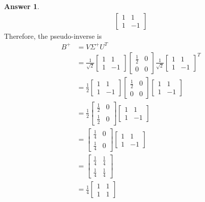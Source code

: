 \documentclass[10pt,a4paper]{article}
\theoremstyle{definition}
\newtheorem*{answer*}{Answer}
\theoremstyle{definition}
\numberwithin{equation}{section}
\begin{document}
\begin{answer*}
\begin{align*}
\begin{bmatrix}
1 & 1\\1 & -1
\end{bmatrix}
\end{align*}
Therefore, the pseudo-inverse is
\begin{align*}
B^+ &= V \Sigma^+ U^T\\
&= \frac{1}{\sqrt{2}}\begin{bmatrix}
1 & 1\\1 & -1
\end{bmatrix} \begin{bmatrix}
\frac{1}{2} & 0\\0 & 0
\end{bmatrix} \frac{1}{\sqrt{2}} \begin{bmatrix}
1 & 1\\1 & -1
\end{bmatrix}^T\\
&= \frac{1}{2} \begin{bmatrix}
1 & 1\\1 & -1
\end{bmatrix} \begin{bmatrix}
\frac{1}{2} & 0\\0 & 0
\end{bmatrix} \begin{bmatrix}
1 & 1\\1 & -1
\end{bmatrix}\\
&= \frac{1}{2} \begin{bmatrix}
\frac{1}{2} & 0\\\frac{1}{2} & 0
\end{bmatrix} \begin{bmatrix}
1 & 1\\1 & -1
\end{bmatrix}\\
&= \begin{bmatrix}
\frac{1}{4} & 0\\\frac{1}{4} & 0
\end{bmatrix} \begin{bmatrix}
1 & 1\\1 & -1
\end{bmatrix}\\
&= \begin{bmatrix}
\frac{1}{4} & \frac{1}{4}\\
\frac{1}{4} & \frac{1}{4}
\end{bmatrix}\\
&= \frac{1}{4} \begin{bmatrix}
1 & 1\\1 & 1
\end{bmatrix}
\end{align*}
\end{answer*}
\end{document}
